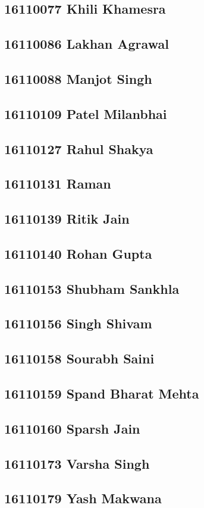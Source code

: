 \documentclass[journal=jpcbfk,manuscript=article]{achemso}
\begin{document}
\subsection {16110077	Khili Khamesra}

\subsection {16110086	Lakhan Agrawal}

\subsection {16110088	Manjot Singh}

\subsection {16110109	Patel Milanbhai}

\subsection {16110127	Rahul Shakya}

\subsection {16110131	Raman}

\subsection {16110139	Ritik Jain}

\subsection {16110140	Rohan Gupta}

\subsection {16110153	Shubham Sankhla}

\subsection {16110156	Singh Shivam}

\subsection {16110158	Sourabh Saini}

\subsection {16110159	Spand Bharat Mehta}

\subsection {16110160	Sparsh Jain}

\subsection {16110173	Varsha Singh}

\subsection {16110179	Yash Makwana}


%
%
\end{document}

